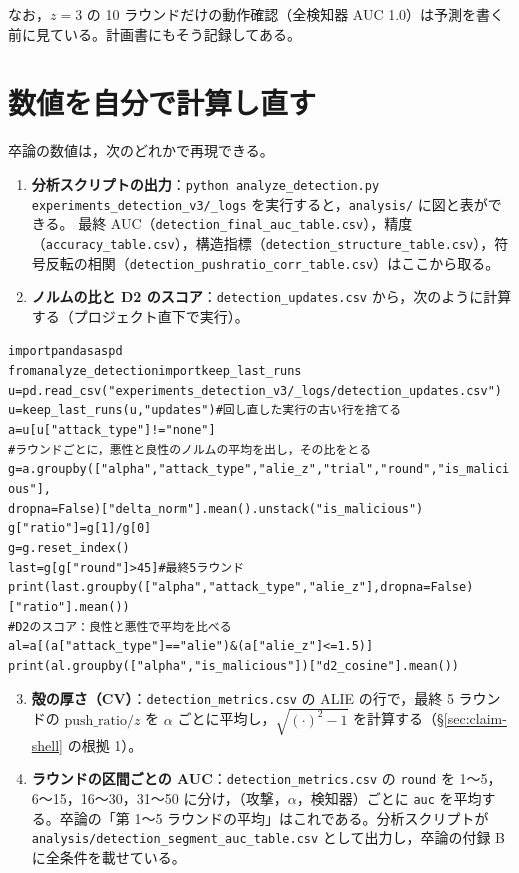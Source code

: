 \documentclass[a4j, dvipdfmx]{jsarticle}  %
\newenvironment{cmd}{\par\vspace{0.3em}\begin{alltt}\small}{\end{alltt}\vspace{0.3em}\par}
\begin{document}
なお，$z = 3$ の 10 ラウンドだけの動作確認（全検知器 AUC 1.0）は予測を書く前に見ている。計画書にもそう記録してある。

\section{数値を自分で計算し直す}
\label{sec:claims-recompute}

卒論の数値は，次のどれかで再現できる。
\begin{enumerate}
  \item \textbf{分析スクリプトの出力}：\texttt{python analyze\_detection.py experiments\_detection\_v3/\_logs} を実行すると，\texttt{analysis/} に図と表ができる。
        最終 AUC（\texttt{detection\_final\_auc\_table.csv}），精度（\texttt{accuracy\_table.csv}），構造指標（\texttt{detection\_structure\_table.csv}），符号反転の相関（\texttt{detection\_pushratio\_corr\_table.csv}）はここから取る。
  \item \textbf{ノルムの比と D2 のスコア}：\texttt{detection\_updates.csv} から，次のように計算する（プロジェクト直下で実行）。
\end{enumerate}

\begin{cmd}
import pandas as pd
from analyze_detection import keep_last_runs
u = pd.read_csv("experiments_detection_v3/_logs/detection_updates.csv")
u = keep_last_runs(u, "updates")            # 回し直した実行の古い行を捨てる
a = u[u["attack_type"] != "none"]
# ラウンドごとに，悪性と良性のノルムの平均を出し，その比をとる
g = a.groupby(["alpha", "attack_type", "alie_z", "trial", "round", "is_malicious"],
              dropna=False)["delta_norm"].mean().unstack("is_malicious")
g["ratio"] = g[1] / g[0]
g = g.reset_index()
last = g[g["round"] > 45]                    # 最終 5 ラウンド
print(last.groupby(["alpha", "attack_type", "alie_z"], dropna=False)["ratio"].mean())
# D2 のスコア：良性と悪性で平均を比べる
al = a[(a["attack_type"] == "alie") & (a["alie_z"] <= 1.5)]
print(al.groupby(["alpha", "is_malicious"])["d2_cosine"].mean())
\end{cmd}

\begin{enumerate}
  \setcounter{enumi}{2}
  \item \textbf{殻の厚さ（CV）}：\texttt{detection\_metrics.csv} の ALIE の行で，最終 5 ラウンドの $\mathrm{push\_ratio}/z$ を $\alpha$ ごとに平均し，$\sqrt{(\cdot)^2 - 1}$ を計算する（\S\ref{sec:claim-shell} の根拠 1）。
  \item \textbf{ラウンドの区間ごとの AUC}：\texttt{detection\_metrics.csv} の \texttt{round} を 1〜5，6〜15，16〜30，31〜50 に分け，（攻撃，$\alpha$，検知器）ごとに \texttt{auc} を平均する。卒論の「第 1〜5 ラウンドの平均」はこれである。分析スクリプトが \texttt{analysis/detection\_segment\_auc\_table.csv} として出力し，卒論の付録 B に全条件を載せている。
\end{enumerate}
\end{document}
